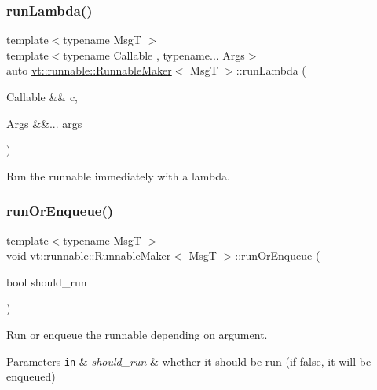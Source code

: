\subsubsection{\texorpdfstring{run\+Lambda()}{runLambda()}}
{\footnotesize\ttfamily template$<$typename MsgT $>$ \\
template$<$typename Callable , typename... Args$>$ \\
auto \hyperlink{structvt_1_1runnable_1_1_runnable_maker}{vt\+::runnable\+::\+Runnable\+Maker}$<$ MsgT $>$\+::run\+Lambda (\begin{DoxyParamCaption}\item[{Callable \&\&}]{c,  }\item[{Args \&\&...}]{args }\end{DoxyParamCaption})\hspace{0.3cm}{\ttfamily [inline]}}



Run the runnable immediately with a lambda. 

\mbox{\label{structvt_1_1runnable_1_1_runnable_maker_aa0ae94d80e43385c18ee1e2afbce59a2}} 
\subsubsection{\texorpdfstring{run\+Or\+Enqueue()}{runOrEnqueue()}}
{\footnotesize\ttfamily template$<$typename MsgT $>$ \\
void \hyperlink{structvt_1_1runnable_1_1_runnable_maker}{vt\+::runnable\+::\+Runnable\+Maker}$<$ MsgT $>$\+::run\+Or\+Enqueue (\begin{DoxyParamCaption}\item[{bool}]{should\+\_\+run }\end{DoxyParamCaption})\hspace{0.3cm}{\ttfamily [inline]}}



Run or enqueue the runnable depending on argument. 


\begin{DoxyParams}[1]{Parameters}
\mbox{\tt in}  & {\em should\+\_\+run} & whether it should be run (if false, it will be enqueued) \\
\hline
\end{DoxyParams}
\mbox{\label{structvt_1_1runnable_1_1_runnable_maker_add114dad8a3f0769bed8b8396ba9a13a}} 
